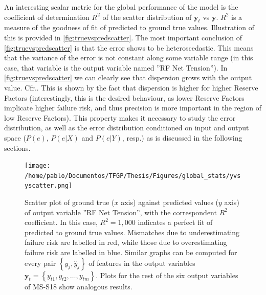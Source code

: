 \indent An interesting scalar metric for the global performance of the model is the coefficient of determination $R^2$ \cite{zhang2017coefficient} of the scatter distribution of $\mathbf{y}_t$ vs $\mathbf{{y}}$. $R^2$ is a measure of the goodness of fit of predicted to ground true values. Illustration of this is provided in \autoref{fig:truevspredscatter}. The most important conclusion of \autoref{fig:truevspredscatter} is that the error shows to be heteroscedastic. This means that the variance of the error is not constant along some variable range (in this case, that variable is the output variable named ''RF Net Tension''). In \autoref{fig:truevspredscatter} we can clearly see that dispersion grows with the output value. Cfr.\cite[p. 374]{jobson2012applied}. This is shown by the fact that dispersion is higher for higher Reserve Factors (interestingly, this is the desired behaviour, as lower Reserve Factors implicate higher failure risk, and thus precision is more important in the region of low Reserve Factors). This property makes it necessary to study the error distribution, as well as the error distribution conditioned on input and output space ($P(e)$, $P(e|{X})$ and $P(e|{Y})$, resp.) as is discussed in the following sections.\\
%
\begin{figure}
	\centering
	\texttt{[image: /home/pablo/Documentos/TFGP/Thesis/Figures/global\_stats/yvsyscatter.png]}
	\caption{Scatter plot of ground true ($x$ axis) against predicted values ($y$ axis) of output variable ''RF Net Tension'', with the correspondent $R^2$ coefficient. In this case, $R^2=1,000$ indicates a perfect fit of predicted to ground true values. Mismatches due to underestimating failure risk are labelled in red, while those due to overestimating failure risk are labelled in blue. Similar graphs can be computed for every pair $\left\{y_j,\hat{y}_j\right\}$ of features in the output variables $\mathbf{y}_t=\left\{y_{t1},y_{t2},\ldots,y_{tm}\right\}$. Plots for the rest of the six output variables of MS-S18 show analogous results.}
	\label{fig:truevspredscatter}
\end{figure}
%
\clearpage
